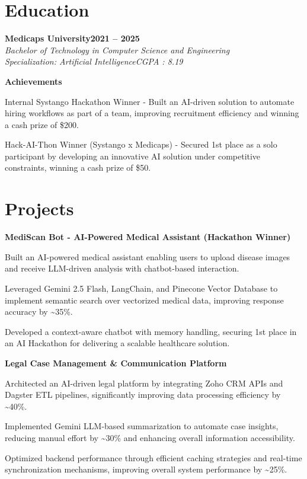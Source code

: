 \documentclass[letterpaper,10pt]{article}
\newcommand{\heading}[2]{
  \hspace{10pt}#1\hfill#2\\
}
\newcommand{\headingBf}[2]{
  \heading{\textbf{#1}}{\textbf{#2}}
}
\newcommand{\headingIt}[2]{
  \heading{\textit{#1}}{\textit{#2}}
}
\newenvironment{resume_list}{
  \vspace{-7pt}
  \begin{itemize}[itemsep=-2px, parsep=1pt, leftmargin=30pt]
}{
  \end{itemize}
}
\begin{document}
\section{Education}
\headingBf{Medicaps University}{2021 -- 2025}
\headingIt{Bachelor of Technology in Computer Science and Engineering}{}
\headingIt{Specialization: Artificial Intelligence}{CGPA : 8.19}

\vspace{5pt}
\headingBf{Achievements}{}
\begin{resume_list}
  \item Internal Systango Hackathon Winner - Built an AI-driven solution to automate hiring workflows as part of a team, improving recruitment efficiency and winning a cash prize of \$200.
  \item Hack-AI-Thon Winner (Systango x Medicaps) - Secured 1st place as a solo participant by developing an innovative AI solution under competitive constraints, winning a cash prize of \$50.
\end{resume_list}

\section{Projects}
\headingBf{MediScan Bot - AI-Powered Medical Assistant (Hackathon Winner)}{}
\begin{resume_list}
  \item Built an AI-powered medical assistant enabling users to upload disease images and receive LLM-driven analysis with chatbot-based interaction.
  \item Leveraged Gemini 2.5 Flash, LangChain, and Pinecone Vector Database to implement semantic search over vectorized medical data, improving response accuracy by \textasciitilde{}35\%.
  \item Developed a context-aware chatbot with memory handling, securing 1st place in an AI Hackathon for delivering a scalable healthcare solution.
\end{resume_list}

\headingBf{Legal Case Management \& Communication Platform}{}
\begin{resume_list}
  \item Architected an AI-driven legal platform by integrating Zoho CRM APIs and Dagster ETL pipelines, significantly improving data processing efficiency by \textasciitilde{}40\%.
  \item Implemented Gemini LLM-based summarization to automate case insights, reducing manual effort by \textasciitilde{}30\% and enhancing overall information accessibility.
  \item Optimized backend performance through efficient caching strategies and real-time synchronization mechanisms, improving overall system performance by \textasciitilde{}25\%.
\end{resume_list}
\end{document}
